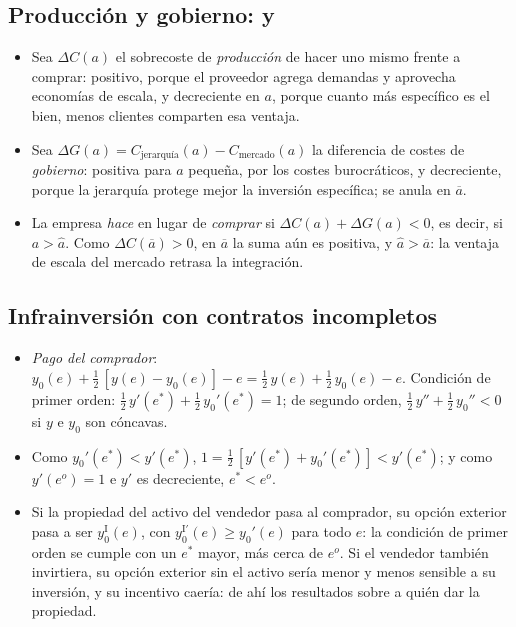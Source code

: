 \documentclass[11pt]{article}
\begin{document}
\subsection{Producción y gobierno:  y }\label{anexo:riordan-williamson}

\begin{itemize}
\item Sea $\Delta C(a)$ el sobrecoste de \emph{producción} de hacer uno mismo frente a comprar: positivo, porque el proveedor agrega demandas y aprovecha economías de escala, y decreciente en $a$, porque cuanto más específico es el bien, menos clientes comparten esa ventaja.
\item Sea $\Delta G(a)=C_{\text{jerarquía}}(a)-C_{\text{mercado}}(a)$ la diferencia de costes de \emph{gobierno}: positiva para $a$ pequeña, por los costes burocráticos, y decreciente, porque la jerarquía protege mejor la inversión específica; se anula en $\overline{a}$.
\item La empresa \emph{hace} en lugar de \emph{comprar} si $\Delta C(a)+\Delta G(a)<0$, es decir, si $a>\hat a$. Como $\Delta C(\overline{a})>0$, en $\overline{a}$ la suma aún es positiva, y $\hat a>\overline{a}$: la ventaja de escala del mercado retrasa la integración\nocite{RiordanWilliamson1985Asset,Williamson1985Economic}.\findemo
\end{itemize}

\subsection{Infrainversión con contratos incompletos}\label{anexo:ghm}

\begin{itemize}
\item \emph{Pago del comprador}: $y_0(e)+\tfrac12\,[y(e)-y_0(e)]-e=\tfrac12\,y(e)+\tfrac12\,y_0(e)-e$. Condición de primer orden: $\tfrac12\,y'(e^{*})+\tfrac12\,y_0'(e^{*})=1$; de segundo orden, $\tfrac12\,y''+\tfrac12\,y_0''<0$ si $y$ e $y_0$ son cóncavas.
\item Como $y_0'(e^{*})<y'(e^{*})$, $1=\tfrac12\,[y'(e^{*})+y_0'(e^{*})]<y'(e^{*})$; y como $y'(e^{o})=1$ e $y'$ es decreciente, $e^{*}<e^{o}$.
\item Si la propiedad del activo del vendedor pasa al comprador, su opción exterior pasa a ser $y_0^{\mathrm{I}}(e)$, con $y_0^{\mathrm{I}\prime}(e)\geq y_0'(e)$ para todo $e$: la condición de primer orden se cumple con un $e^{*}$ mayor, más cerca de $e^{o}$. Si el vendedor también invirtiera, su opción exterior sin el activo sería menor y menos sensible a su inversión, y su incentivo caería: de ahí los resultados sobre a quién dar la propiedad\nocite{Hart1995Firms}.\findemo
\end{itemize}
\end{document}
